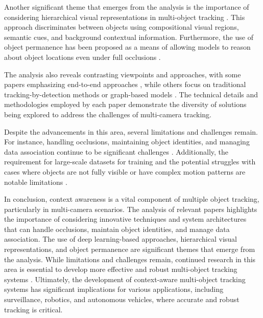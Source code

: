 \documentclass[conference]{IEEEtran}
\begin{document}
Another significant theme that emerges from the analysis is the importance of considering hierarchical visual representations in multi-object tracking \cite{Multi-Object Tracking by Hierarchical Visual Representations}. This approach discriminates between objects using compositional visual regions, semantic cues, and background contextual information. Furthermore, the use of object permanence has been proposed as a means of allowing models to reason about object locations even under full occlusions \cite{Learning to Track with Object Permanence}. 

The analysis also reveals contrasting viewpoints and approaches, with some papers emphasizing end-to-end approaches \cite{MCTR: Multi Camera Tracking Transformer}, while others focus on traditional tracking-by-detection methods or graph-based models \cite{An equalised global graphical model-based approach for multi-camera object tracking}. The technical details and methodologies employed by each paper demonstrate the diversity of solutions being explored to address the challenges of multi-camera tracking. 

Despite the advancements in this area, several limitations and challenges remain. For instance, handling occlusions, maintaining object identities, and managing data association continue to be significant challenges \cite{The Challenge of Multi-Camera Tracking}. Additionally, the requirement for large-scale datasets for training and the potential struggles with cases where objects are not fully visible or have complex motion patterns are notable limitations \cite{MCTR: Multi Camera Tracking Transformer}. 

In conclusion, context awareness is a vital component of multiple object tracking, particularly in multi-camera scenarios. The analysis of relevant papers highlights the importance of considering innovative techniques and system architectures that can handle occlusions, maintain object identities, and manage data association. The use of deep learning-based approaches, hierarchical visual representations, and object permanence are significant themes that emerge from the analysis. While limitations and challenges remain, continued research in this area is essential to develop more effective and robust multi-object tracking systems \cite{The Challenge of Multi-Camera Tracking}. Ultimately, the development of context-aware multi-object tracking systems has significant implications for various applications, including surveillance, robotics, and autonomous vehicles, where accurate and robust tracking is critical.
\end{document}
